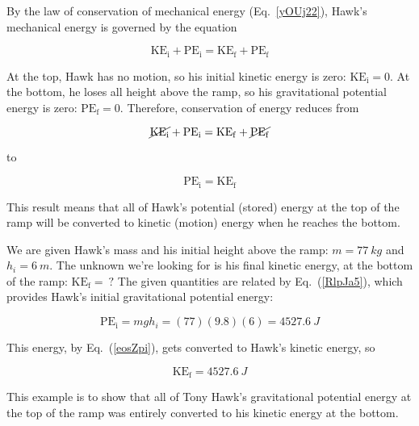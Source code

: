 \documentclass[main.tex]{subfiles}
\begin{document}
\Solution By the law of conservation of mechanical energy (Eq.~\ref{yOUj22}), Hawk's mechanical energy is governed by the equation

\begin{equation*} 
    \mathrm{KE_i} + \mathrm{PE_i} = \mathrm{KE_f} + \mathrm{PE_f}
\end{equation*}

At the top, Hawk has no motion, so his initial kinetic energy is zero: $\mathrm{KE_i} = 0$. At the bottom, he loses all height above the ramp, so his gravitational potential energy is zero: $\mathrm{PE_f} = 0$. Therefore, conservation of energy reduces from

\begin{equation*}
        \cancel{\mathrm{KE_i}} + \mathrm{PE_i} = \mathrm{KE_f} + \cancel{\mathrm{PE_f}}
\end{equation*}

to

\begin{equation} \label{eosZpi}
    \mathrm{PE_i} = \mathrm{KE_f}
\end{equation}

This result means that all of Hawk's potential (stored) energy at the top of the ramp will be converted to kinetic (motion) energy when he reaches the bottom.
\vspace{1em}

We are given Hawk's mass and his initial height above the ramp: $m = \SI{77}{kg}$ and $h_i = \SI{6}{m}$. The unknown we're looking for is his final kinetic energy, at the bottom of the ramp: $\mathrm{KE_f} =\ ?$ The given quantities are related by Eq.~(\ref{RlpJa5}), which provides Hawk's initial gravitational potential energy:

\begin{equation*}
    \mathrm{PE_i} = mgh_i = (77)(9.8)(6) = \SI{4527.6}{J} 
\end{equation*}

This energy, by Eq.~(\ref{eosZpi}), gets converted to Hawk's kinetic energy, so

\begin{equation*}
    \mathrm{KE_f} = \SI{4527.6}{J} 
\end{equation*}

This example is to show that all of Tony Hawk's gravitational potential energy at the top of the ramp was entirely converted to his kinetic energy at the bottom.

\endsolution

\vspace{1em}
\end{document}
